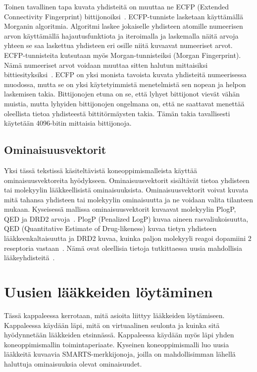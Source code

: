 \documentclass[finnish,twoside,censored,tkt,sw-line]{HYthesisML}
\begin{document}
Toinen tavallinen tapa kuvata yhdisteitä on muuttaa ne ECFP (Extended Connectivity Fingerprint) bittijonoiksi~\cite{RogersDavid2010EF}.
ECFP-tunniste lasketaan käyttämällä Morganin algoritmia.
Algoritmi laskee jokaiselle yhdisteen atomille numeerisen arvon käyttämällä hajautusfunktiota ja iteroimalla ja laskemalla näitä arvoja yhteen se saa laskettua yhdisteen eri osille niitä kuvaavat numeeriset arvot.
ECFP-tunnisteita kutsutaan myös Morgan-tunnisteiksi (Morgan Fingerprint).
Nämä numeeriset arvot voidaan muuttaa sitten halutun mittaisiksi bittiesityksiksi~\cite{RogersDavid2010EF}.
ECFP on yksi monista tavoista kuvata yhdisteitä numeerisessa muodossa, mutta se on yksi käytetyimmistä menetelmistä sen nopean ja helpon laskemisen takia.
Bittijonojen etuna on se, että lyhyet bittijonot vievät vähän muistia, mutta lyhyiden bittijonojen ongelmana on, että ne saattavat menettää oleellista tietoa yhdisteestä bittitörmäysten takia.
Tämän takia tavallisesti käytetään 4096-bitin mittaisia bittijonoja.

\section{Ominaisuusvektorit}

Yksi tässä tekstissä käsiteltävistä koneoppimismalleista käyttää ominaisuusvektoreita hyödykseen.
Ominaisuusvektorit sisältävät tietoa yhdisteen tai molekyylin lääkkeellisistä ominaisuuksista.
Ominaisuusvektorit voivat kuvata mitä tahansa yhdisteen tai molekyylin ominaisuutta ja ne voidaan valita tilanteen mukaan.
Kyseisessä mallissa ominaisuusvektorit kuvaavat molekyylin PlogP, QED ja DRD2 arvoja~\cite{ShinBonggun}.
PlogP (Penalized LogP) kuvaa aineen rasvaliukoisuutta, QED (Quantitative Estimate of Drug-likeness) kuvaa tietyn yhdisteen lääkkeenkaltaisuutta ja DRD2 kuvaa, kuinka paljon molekyyli reagoi dopamiini 2 reseptoria vastaan~\cite{BickertonGRichard2012Qtcb}.
Nämä ovat oleellisia tietoja tutkittaessa uusia mahdollisia lääkeyhdisteitä~\cite{ShinBonggun}.

\chapter{Uusien lääkkeiden löytäminen}

Tässä kappaleessa kerrotaan, mitä asioita liittyy lääkkeiden löytämiseen.
Kappaleessa käydään läpi, mitä on virtuaalinen seulonta ja kuinka sitä hyödynnetään lääkkeiden etsinnässä.
Kappaleessa käydään myös läpi yhden koneoppimismallin toimintaperiaate.
Kyseinen koneoppimismalli luo uusia lääkkeitä kuvaavia SMARTS-merkkijonoja, joilla on mahdollisimman lähellä haluttuja ominaisuuksia olevat ominaisuudet.
\end{document}
